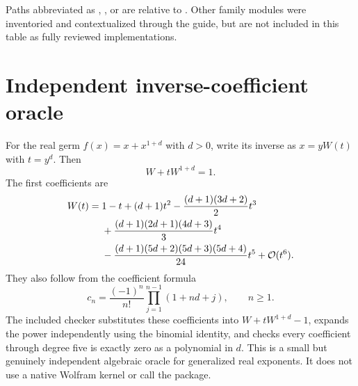 \documentclass[11pt,letterpaper]{article}
\newcommand{\OO}{\mathcal{O}}
\begin{document}
Paths abbreviated as , , or  are relative to . Other family modules were inventoried and contextualized through the guide, but are not included in this table as fully reviewed implementations.

\section{Independent inverse-coefficient oracle}
For the real germ $f(x)=x+x^{1+d}$ with $d>0$, write its inverse as $x=yW(t)$ with $t=y^d$. Then
\begin{equation}
 W+tW^{1+d}=1.
\end{equation}
The first coefficients are
\begin{align}
 W(t)={}&1-t+(d+1)t^2-\frac{(d+1)(3d+2)}2t^3\notag\\
 &+\frac{(d+1)(2d+1)(4d+3)}3t^4\notag\\
 &-\frac{(d+1)(5d+2)(5d+3)(5d+4)}{24}t^5+\OO(t^6).
\end{align}
They also follow from the coefficient formula
\begin{equation}
 c_n=\frac{(-1)^n}{n!}\prod_{j=1}^{n-1}(1+nd+j),\qquad n\ge1.
\end{equation}
The included checker substitutes these coefficients into $W+tW^{1+d}-1$, expands the power independently using the binomial identity, and checks every coefficient through degree five is exactly zero as a polynomial in $d$. This is a small but genuinely independent algebraic oracle for generalized real exponents. It does not use a native Wolfram kernel or call the package.
\end{document}
